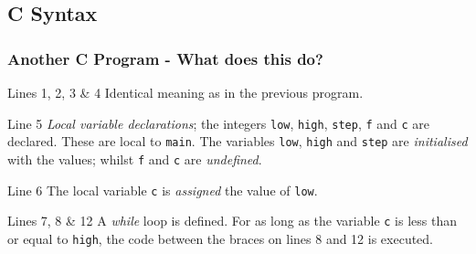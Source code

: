 \documentclass[smaller,handout,table]{beamer}
\begin{document}
\subsection{C Syntax}
\ifhandout
\begin{frame}[fragile]
\frametitle {Another C Program - What does this do?}

\end{frame}

\begin{frame}
\begin{block}{Lines 1, 2, 3 \& 4}
Identical meaning as in the previous program.
\end{block}

\begin{block}{Line 5}
\emph{Local variable declarations}; the integers {\tt low}, {\tt high},
{\tt step}, {\tt f} and {\tt c} are declared. These are local to {\tt main}.
The variables {\tt low}, {\tt high} and {\tt step} are \emph{initialised}
with the values; whilst {\tt f} and {\tt c} are \emph{undefined}.
\end{block}
 
\begin{block}{Line 6}
The local variable {\tt c} is \emph{assigned} the value of
{\tt low}.
\end{block}

\begin{block}{Lines 7, 8 \& 12}
A \emph{while} loop is defined. For as long as the variable {\tt c} is less than or equal to {\tt high}, the code between the braces on lines 8 and 12 is executed.
\end{block}

\end{frame}
\end{document}
